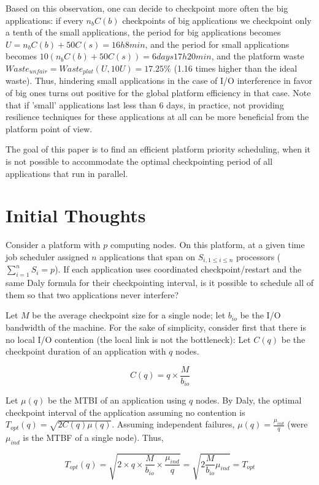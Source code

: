 \documentclass{article}
\begin{document}
Based on this observation, one can decide to checkpoint more often the big applications: if every $n_bC(b)$ checkpoints of big applications we checkpoint only a tenth of the small applications, the period for big applications becomes $U = n_bC(b)+50C(s) = 16h8min$, and the period for small applications becomes $10(n_bC(b)+50C(s)) = 6 days 17h 20min$, and the platform waste $Waste_{unfair} = Waste_{plat}(U, 10U) = 17.25\%$ (1.16 times higher than the ideal waste). Thus, hindering small applications in the case of I/O interference in favor of big ones turns out positive for the global platform efficiency in that case. Note that if 'small' applications last less than 6 days, in practice, not providing resilience techniques for these applications at all can be more beneficial from the platform point of view.

The goal of this paper is to find an efficient platform priority scheduling, when it is not possible to accommodate the optimal checkpointing period of all applications that run in parallel.

\pagebreak

\appendix
\section{Initial Thoughts}

Consider a platform with $p$ computing nodes. On this platform, at a given time job scheduler assigned $n$ applications that span on $S_{i, 1 \leq i \leq n}$ processors ($\sum_{i=1}^{n}S_i = p$). If each application uses coordinated checkpoint/restart and the same Daly formula for their checkpointing interval, is it possible to schedule all of them so that two applications never interfere?

Let $M$ be the average checkpoint size for a single node; let $b_{io}$ be the I/O bandwidth of the machine. For the sake of simplicity, consider first that there is no local I/O contention (the local link is not the bottleneck): Let $C(q)$ be the checkpoint duration of an application with $q$ nodes.

$$C(q) = q\times \frac{M}{b_{io}}$$

Let $\mu(q)$ be the MTBI of an application using $q$ nodes. By Daly, the optimal checkpoint interval of the application assuming no contention is $T_{opt}(q) = \sqrt{2C(q)\mu(q)}$. Assuming independent failures, $\mu(q) = \frac{\mu_{ind}}{q}$ (were $\mu_{ind}$ is the MTBF of a single node). Thus,

$$T_{opt}(q) = \sqrt{2\times q\times \frac{M}{b_{io}} \times \frac{\mu_{ind}}{q}} = \sqrt{2\frac{M}{b_{io}}\mu_{ind}} = T_{opt}$$
\end{document}
